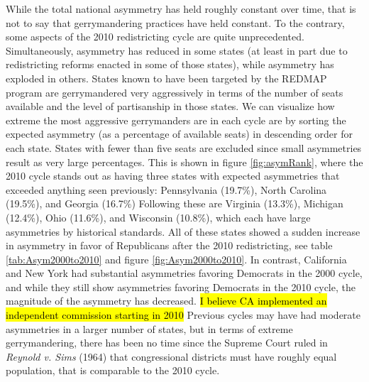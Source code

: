 \documentclass[preprint,12pt]{article}
\newcommand{\CM}[2][green]{ {\sethlcolor{#1} \hl{#2}} }
\begin{document}
While the total national asymmetry has held roughly constant over time, that is not to say that gerrymandering practices have held constant.
To the contrary, some aspects of the 2010 redistricting cycle are quite unprecedented.
Simultaneously, asymmetry has reduced in some states (at least in part due to redistricting reforms enacted in some of those states), while asymmetry has exploded in others.
States known to have been targeted by the REDMAP program are gerrymandered very aggressively in terms of the number of seats available and the level of partisanship in those states.
We can visualize how extreme the most aggressive gerrymanders are in each cycle are by sorting the expected asymmetry (as a percentage of available seats) in descending order for each state.
States with fewer than five seats are excluded since small asymmetries result as very large percentages.
This is shown in figure \ref{fig:asymRank}, where the 2010 cycle stands out as having three states with expected asymmetries that exceeded anything seen previously: Pennsylvania (19.7\%), North Carolina (19.5\%), and Georgia (16.7\%)
Following these are Virginia (13.3\%), Michigan (12.4\%), Ohio (11.6\%), and Wisconsin (10.8\%), which each have large asymmetries by historical standards.
All of these states showed a sudden increase in asymmetry in favor of Republicans after the 2010 redistricting, see table \ref{tab:Asym2000to2010} and figure \ref{fig:Asym2000to2010}. 
In contrast, California and New York had substantial asymmetries favoring Democrats in the 2000 cycle, and while they still show asymmetries favoring Democrats in the 2010 cycle, the magnitude of the asymmetry has decreased.
\CM{I believe CA implemented an independent commission starting in 2010}
Previous cycles may have had moderate asymmetries in a larger number of states, but in terms of extreme gerrymandering, there has been no time since the Supreme Court ruled in \emph{Reynold v. Sims} (1964) that congressional districts must have roughly equal population, that is comparable to the 2010 cycle.
\end{document}
